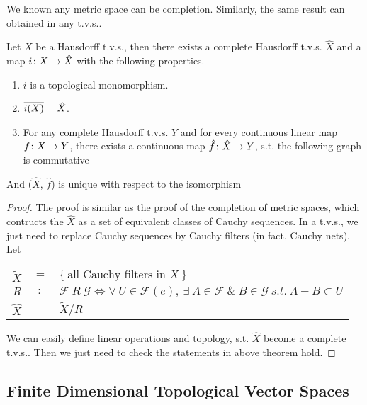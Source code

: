 \documentclass[a4paper,11pt]{report}
\begin{document}
We known any metric space can be completion. Similarly, the same result can obtained in any t.v.s..
\begin{thm}
	Let $X$ be a Hausdorff t.v.s., then there exists a complete Hausdorff t.v.s. $\hat{X}$ and a map $i \colon X \rightarrow \hat{X}$ with the following properties.
	\begin{enumerate}[label=\arabic*)]
		\item $i$ is a topological monomorphism.
		\item $\overline{i(X)} = \hat{X}$.
		\item For any complete Hausdorff t.v.s. $Y$ and for every continuous linear map $f \colon X \rightarrow Y$, there exists a continuous map $\hat{f} \colon \hat{X} \rightarrow Y$, s.t. the following graph is commutative
		\begin{center}
		\end{center}
	\end{enumerate}
	And ($\hat{X}$, $\hat{f}$) is unique with respect to the isomorphism
\end{thm}
\begin{proof}
	The proof is similar as the proof of the completion of metric spaces, which contructs the $\hat{X}$ as a set of equivalent classes of Cauchy sequences. In a t.v.s., we just need to replace Cauchy sequences by Cauchy filters (in fact, Cauchy nets). Let 
	\begin{center}
		\begin{tabular}{r c l}
			$\tilde{X}$ & $=$ & $\{~ \text{all Cauchy filters in } X ~\}$\\
			$R $ & $\colon$ & $ \mathscr{F} ~R~ \mathscr{G} \Leftrightarrow \forall ~ U \in \mathscr{F}(e),~ \exists ~ A \in \mathscr{F} ~\&~ B \in \mathscr{G} ~s.t.~ A-B \subset U$\\
			$\hat{X}$& $=$ & $\tilde{X} / R$
		\end{tabular}
	\end{center}
	We can easily define linear operations and topology, s.t. $\hat{X}$ become a complete t.v.s.. Then we just need to check the statements in above theorem hold.
\end{proof}

\subsection{Finite Dimensional Topological Vector Spaces}
\end{document}
